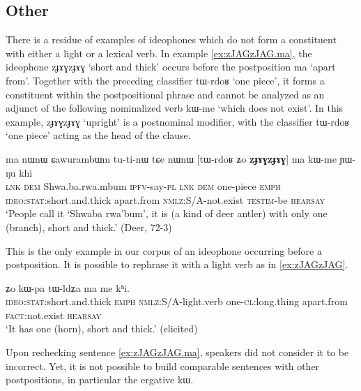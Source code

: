 \documentclass[oldfontcommands,oneside,a4paper,11pt]{article}
\newcommand{\ipa}[1]{{\phon \mbox{#1}}} %
\begin{document}


    \subsection{Other}
   There is a residue of examples of ideophones which do not form a constituent with either a light or a lexical verb. In example \ref{ex:zJAGzJAG.ma}, the ideophone 	\ipa{zɟɤɣzɟɤɣ} `short and thick' occurs before the postposition \ipa{ma} `apart from'. Together with the preceding classifier \ipa{tɯ-rdoʁ}  `one piece', it forms a constituent within the postpositional phrase and cannot be analyzed as an adjunct of the following nominalized verb  	\ipa{kɯ-me} `which does not exist'. In this example, 	\ipa{zɟɤɣzɟɤɣ} `upright' is a postnominal modifier, with the classifier \ipa{tɯ-rdoʁ} `one piece' acting as  the head of the clause.
   
    \begin{exe}
\ex \label{ex:zJAGzJAG.ma}
\gll 
\ipa{ma} 	\ipa{nɯnɯ} 	\ipa{ɕawurambɯm} 	\ipa{tu-ti-nɯ} 	\ipa{tɕe} 	\ipa{nɯnɯ} 	 [\ipa{tɯ-rdoʁ} 	\ipa{ʑo} 	\ipa{\textbf{zɟɤɣzɟɤɣ}}] 	\ipa{ma} 	\ipa{kɯ-me} 	\ipa{ɲɯ-ŋu} 	\ipa{khi} \\
\textsc{lnk} \textsc{dem} Shwa.ba.rwa.mbum \textsc{ipfv}-say-\textsc{pl} \textsc{lnk} \textsc{dem} one-piece \textsc{emph} \textsc{ideo:stat}:short.and.thick apart.from \textsc{nmlz}:S/A-not.exist \textsc{testim}-be \textsc{hearsay} \\
\glt `People call it `Shwaba rwa'bum', it is (a  kind of deer antler) with only one (branch), short and thick.' 
 (Deer, 72-3)
\end{exe}

This is the only example in our corpus of an ideophone occurring before a postposition. It is possible to rephrase it with a light verb as in \ref{ex:zJAGzJAG}.  
    \begin{exe}
\ex \label{ex:zJAGzJAG}
\gll \ipa{\textbf{zɟɤɣzɟɤɣ}} 	\ipa{ʑo} 	\ipa{kɯ-pa} 	\ipa{tɯ-ldʑa} 	\ipa{ma} 	\ipa{me} 	\ipa{kʰi.}  \\
\textsc{ideo:stat}:short.and.thick \textsc{emph} \textsc{nmlz}:S/A-light.verb one-\textsc{cl}:long.thing apart.from \textsc{fact}:not.exist \textsc{hearsay} \\
\glt `It  has one (horn), short and thick.' (elicited)
\end{exe}

Upon rechecking  sentence \ref{ex:zJAGzJAG.ma}, speakers did not consider it to be incorrect. Yet,  it is not possible to build comparable sentences with other postpositions, in particular the ergative \ipa{kɯ}. 
\end{document}
